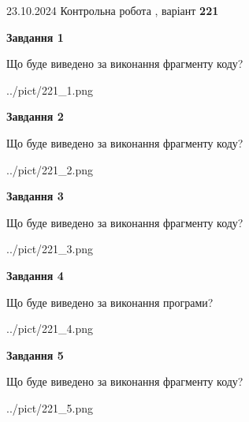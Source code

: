 \documentclass[12pt, ukrainian]{article}
\begin{document}
{\Large{23.10.2024 Контрольна робота , варіант  \No \textbf { 221 }\par}}
{
\begin {large}
{\begin {center}\textbf{Завдання 1}\end {center}}

Що буде виведено за виконання фрагменту коду?\par
\begin{center}
	{../pict/221_1.png}
\end{center}
\newpage

{\begin {center}\textbf{Завдання 2}\end {center}}

Що буде виведено за виконання фрагменту коду?\par
\begin{center}
	{../pict/221_2.png}
\end{center}
\newpage

{\begin {center}\textbf{Завдання 3}\end {center}}

Що буде виведено за виконання фрагменту коду?\par
\begin{center}
	{../pict/221_3.png}
\end{center}
\newpage

{\begin {center}\textbf{Завдання 4}\end {center}}

Що буде виведено за виконання програми?\par
\begin{center}
	{../pict/221_4.png}
\end{center}
\newpage

{\begin {center}\textbf{Завдання 5}\end {center}}

Що буде виведено за виконання фрагменту коду?\par
\begin{center}
	{../pict/221_5.png}
\end{center}
\newpage


\end{large}}
\end{document}
